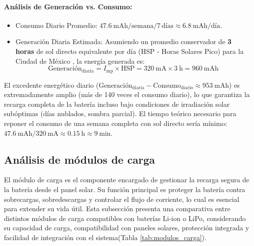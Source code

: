 \paragraph{Análisis de Generación vs. Consumo:}
\begin{itemize}
    \item Consumo Diario Promedio: $\SI{47.6}{\milli\ampere\hour / \text{semana}} / 7\,\text{días} \approx \SI{6.8}{\milli\ampere\hour / \text{día}}$.
    \item Generación Diaria Estimada: Asumiendo un promedio conservador de \textbf{3 horas} de sol directo equivalente por día (HSP - Horas Solares Pico) para la Ciudad de México \cite{solarGIS}, la energía generada es:
    \begin{equation} \label{eq:generacion_diaria}
    \text{Generación}_{\text{diaria}} = I_{\text{mp}} \times \text{HSP} = \SI{320}{\milli\ampere} \times \SI{3}{\hour} = \SI{960}{\milli\ampere\hour}
    \end{equation}
\end{itemize}
El excedente energético diario ($\text{Generación}_{\text{diaria}} - \text{Consumo}_{\text{diario}} \approx \SI{953}{\milli\ampere\hour}$) es extremadamente amplio (más de 140 veces el consumo diario), lo que garantiza la recarga completa de la batería incluso bajo condiciones de irradiación solar subóptimas (días nublados, sombra parcial). El tiempo teórico necesario para reponer el consumo de una semana completa con sol directo sería mínimo: $\SI{47.6}{\milli\ampere\hour} / \SI{320}{\milli\ampere} \approx \SI{0.15}{\hour} \approx \SI{9}{\minute}$.

\subsection{Análisis de módulos de carga}

El módulo de carga es el componente encargado de gestionar la recarga segura de la batería desde el panel solar. Su función principal es proteger la batería contra sobrecargas, sobredescargas y controlar el flujo de corriente, lo cual es esencial para extender su vida útil. Esta subsección presenta una comparativa entre distintos módulos de carga compatibles con baterías Li-ion o LiPo, considerando su capacidad de carga, compatibilidad con paneles solares, protección integrada y facilidad de integración con el sistema(Tabla \ref{tab:modulos_carga}).

